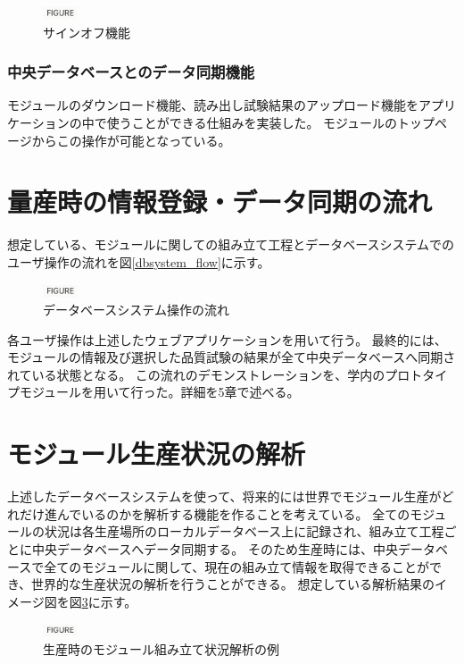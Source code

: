 \begin{figure}[bpt]\centering
\includegraphics[width=1cm]{figure}
\caption[サインオフ機能]{サインオフ機能}
\label{webapp_sign_off}
\end{figure}

\subsubsection{中央データベースとのデータ同期機能}
モジュールのダウンロード機能、読み出し試験結果のアップロード機能をアプリケーションの中で使うことができる仕組みを実装した。
モジュールのトップページからこの操作が可能となっている。

\section{量産時の情報登録・データ同期の流れ}
想定している、モジュールに関しての組み立て工程とデータベースシステムでのユーザ操作の流れを図\ref{dbsystem_flow}に示す。

\begin{figure}[bpt]\centering
\includegraphics[width=1cm]{figure}
\caption[データベースシステム操作の流れ]{データベースシステム操作の流れ}
\label{webapp_sign_off}
\end{figure}

各ユーザ操作は上述したウェブアプリケーションを用いて行う。
最終的には、モジュールの情報及び選択した品質試験の結果が全て中央データベースへ同期されている状態となる。
この流れのデモンストレーションを、学内のプロトタイプモジュールを用いて行った。詳細を5章で述べる。

\section{モジュール生産状況の解析}
上述したデータベースシステムを使って、将来的には世界でモジュール生産がどれだけ進んでいるのかを解析する機能を作ることを考えている。
全てのモジュールの状況は各生産場所のローカルデータベース上に記録され、組み立て工程ごとに中央データベースへデータ同期する。
そのため生産時には、中央データベースで全てのモジュールに関して、現在の組み立て情報を取得できることができ、世界的な生産状況の解析を行うことができる。
想定している解析結果のイメージ図を図\ref{production_analysis}に示す。

\begin{figure}[bpt]\centering
\includegraphics[width=1cm]{figure}
\caption[生産時のモジュール組み立て状況解析の例]{生産時のモジュール組み立て状況解析の例}
\label{production_analysis}
\end{figure}

